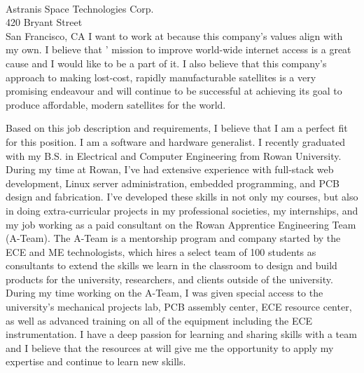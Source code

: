 \documentclass[11pt]{letter} %
\begin{document}
\begin{letter}{\\
Astranis Space Technologies Corp.\\
420 Bryant Street\\
San Francisco, CA}
I want to work at {\company} because this company's values
align with my own. I believe that {\company}' mission to improve world-wide internet
access is a great cause and I would like to be a part of it. I also believe
that this company's approach to making lost-cost, rapidly manufacturable
satellites is a very promising endeavour and will continue to be successful
at achieving its goal to produce affordable, modern satellites for the world.

Based on this job description and requirements, I believe that I am a perfect
fit for this position. I am a software and hardware generalist. I recently
graduated with my B.S. in Electrical and Computer Engineering from Rowan
University. During my time at Rowan, I've had extensive experience with
full-stack web development, Linux server administration, embedded programming,
and PCB design and fabrication. I've developed these skills in not only my courses,
but also in doing extra-curricular projects in my professional societies, my internships, and my job working
as a paid consultant on the Rowan Apprentice Engineering Team (A-Team). The
A-Team is a mentorship program and company started by the ECE and ME technologists, which hires a
select team of 100 students as consultants to extend the skills we learn in
the classroom to design and build products for the university, researchers, and
clients outside of the university.
During my time working on the A-Team, I was given special access to the university's
mechanical projects lab, PCB assembly center, ECE resource center, as well as
advanced training on all of the equipment including the ECE instrumentation.
I have a deep passion for learning and sharing skills with a team and I believe that the resources at
{\company} will give me the opportunity to apply my expertise and continue to learn
new skills.


\end{letter}
\end{document}
